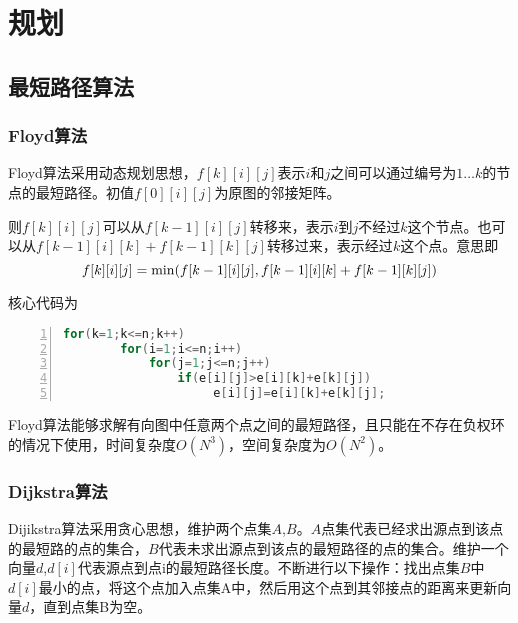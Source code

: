 \chapter{规划}
\section{最短路径算法}
\subsection{Floyd算法}
Floyd算法采用动态规划思想，$f[k][i][j]$表示$i$和$j$之间可以通过编号为$1 \dots k$的节点的最短路径。初值$f[0][i][j]$为原图的邻接矩阵。

则$f[k][i][j]$可以从$f[k-1][i][j]$转移来，表示$i$到$j$不经过$k$这个节点。也可以从$f[k-1][i][k]+f[k-1][k][j]$转移过来，表示经过$k$这个点。意思即
\begin{equation*}
	f[k][i][j] = \rm{min}(f[k-1][i][j], f[k-1][i][k]+f[k-1][k][j])
\end{equation*}

核心代码为
\begin{lstlisting}[language=c,numbers=left,firstnumber = 1,numberstyle=\tiny,breaklines = true,keywordstyle=\color{blue!70},commentstyle=\color{red!50!green!50!blue!50},frame=shadowbox, rulesepcolor=\color{red!20!green!20!blue!20}]
	for(k=1;k<=n;k++)
        for(i=1;i<=n;i++)
            for(j=1;j<=n;j++)
                if(e[i][j]>e[i][k]+e[k][j])
                     e[i][j]=e[i][k]+e[k][j];
\end{lstlisting}

Floyd算法能够求解有向图中任意两个点之间的最短路径，且只能在不存在负权环的情况下使用，时间复杂度$O(N^3)$，空间复杂度为$O(N^2)$。

\subsection{Dijkstra算法}
Dijikstra算法采用贪心思想，维护两个点集$A$,$B$。$A$点集代表已经求出源点到该点的最短路的点的集合，$B$代表未求出源点到该点的最短路径的点的集合。维护一个向量$d$,$d[i]$代表源点到点i的最短路径长度。不断进行以下操作：找出点集$B$中$d[i]$最小的点，将这个点加入点集A中，然后用这个点到其邻接点的距离来更新向量$d$，直到点集B为空。

